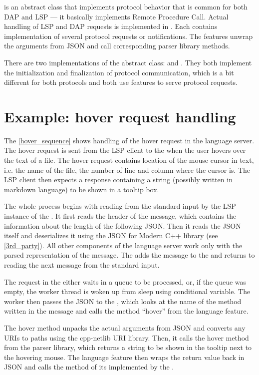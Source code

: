  is an abstract class that implements protocol behavior that is common for both DAP and LSP --- it basically implements Remote Procedure Call. Actual handling of LSP and DAP requests is implemented in . Each  contains implementation of several protocol requests or notifications. The features unwrap the arguments from JSON and call corresponding parser library methods.

There are two implementations of the abstract  class:  and . They both implement the initialization and finalization of protocol communication, which is a bit different for both protocols and both use features to serve protocol requests.

\section{Example: hover request handling}

The \cref{hover_sequence} shows handling of the hover request in the language server. The hover request is sent from the LSP client to the  when the user hovers over the text of a file. The hover request contains location of the mouse cursor in text, i.e. the name of the file, the number of line and column where the cursor is. The LSP client then expects a response containing a string (possibly written in markdown language) to be shown in a tooltip box.

The whole process begins with reading from the standard input by the LSP instance of the . It first reads the header of the message, which contains the information about the length of the following JSON. Then it reads the JSON itself and deserializes it using the JSON for Modern C++ library (see \cref{3rd_party}). All other components of the language server work only with the parsed representation of the message. The  adds the message to the  and returns to reading the next message from the standard input.

The request in the  either waits in a queue to be processed, or, if the queue was empty, the worker thread is woken up from sleep using conditional variable. The worker then passes the JSON to the , which looks at the name of the method written in the message and calls the method ``hover'' from the language feature.

The hover method unpacks the actual arguments from JSON and converts any URIs to paths using the cpp-netlib URI library. Then, it calls the hover method from the parser library, which returns a string to be shown in the tooltip next to the hovering mouse. The language feature then wraps the return value back in JSON and calls the  method of its  implemented by the .

